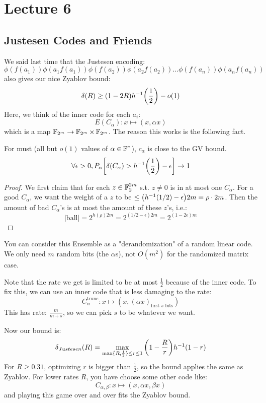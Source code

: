 \section{Lecture 6}

\subsection{Justesen Codes and Friends}
We said last time that the Justesen encoding:
\[ \phi(f(a_1)) \phi(a_1 f(a_1)) \phi(f(a_2)) \phi(a_2 f(a_2)) \dots \phi(f(a_n)) \phi(a_n f(a_n)) \]
also gives our nice Zyablov bound:
\[ \delta(R) \geq (1 - 2R) h^{-1}\qty(\frac{1}{2}) - o(1) \]
Here, we think of the inner code for each $a_i$:
\[ E(C_{\alpha}): x \mapsto (x, \alpha x) \]
which is a map $\operatorname{\mathbb{F}}_{2^m} \to \operatorname{\mathbb{F}}_{2^m} \times \operatorname{\mathbb{F}}_{2^m}$.
The reason this works is the following fact.
\begin{theorem}
    For must (all but $o(1)$ values of $\alpha \in \operatorname{\mathbb{F}}^*$), $c_{\alpha}$ is close to the GV bound.
    \[ \forall \epsilon > 0, P_{\alpha}\qty[\delta(C_{\alpha}) > h^{-1}\qty(\frac{1}{2}) - \epsilon] \to 1 \]
    \begin{proof}
        We first claim that for each $z \in \operatorname{\mathbb{F}}_2^{2m}$ s.t. $z \neq 0$ is in at most one $C_{\alpha}$. 
        For a good $C_{\alpha}$, we want the weight of a $z$ to be $\leq \qty(h^{-1}(1/2) - \epsilon) 2m = \rho \cdot 2m$. Then the amount of bad $C_{\alpha}$'s
        is at most the amount of these $z$'s, i.e.:
        \[ |\text{ball}| = 2^{h(\rho) 2m} = 2^{(1/2 - \epsilon)2m} = 2^{(1 - 2\epsilon)m} \]
    \end{proof}
\end{theorem}
You can consider this Ensemble as a "derandomization" of a random linear code. We only need $m$ random bits (the $\alpha$s), not $O(m^2)$ for the randomized matrix case.

Note that the rate we get is limited to be at most $\frac{1}{2}$ because of the inner code. To fix this, we can use an inner code that is less damaging to the rate:
\[ C_{\alpha}^{\text{trunc}}: x \mapsto (x, (\alpha x)_{\text{first $s$ bits}}) \]
This has rate: $\frac{m}{m + s}$, so we can pick $s$ to be whatever we want.

Now our bound is:
\[ \delta_{Justesen}(R) = \max_{\max\{R, \frac{1}{2}\} \leq r \leq 1} \qty(1 - \frac{R}{r}) h^{-1}(1 - r) \]
For $R \geq 0.31$, optimizing $r$ is bigger than $\frac{1}{2}$, so the bound applies the same as Zyablov. For lower rates $R$,
you have choose some other code like:
\[ C_{\alpha, \beta}: x \mapsto (x, \alpha x, \beta x) \]
and playing this game over and over fits the Zyablov bound.

